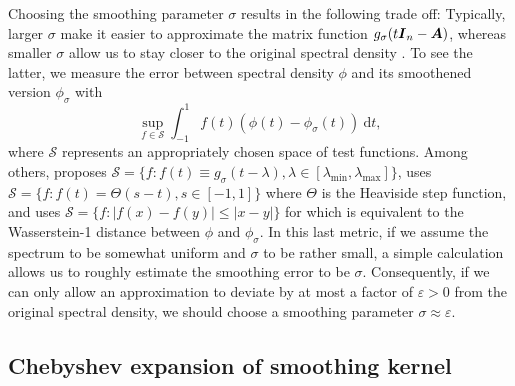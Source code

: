 \documentclass[12pt]{article}
\begin{document}
Choosing the smoothing parameter $\sigma$ results in the following trade off: Typically, larger $\sigma$ make it easier to approximate the matrix function $g_{\sigma}(t\boldsymbol{I}_n - \boldsymbol{A})$, whereas smaller $\sigma$ allow us to stay closer to the original spectral density . To see the latter, we measure the error between spectral density $\phi$ and its smoothened version $\phi_{\sigma}$ with
\begin{equation}
    \sup_{f \in \mathcal{S}} \int_{-1}^{1} f(t) (\phi(t) - \phi_{\sigma}(t))~\mathrm{d}t,
    \label{equ:error-metric}
\end{equation}
where $\mathcal{S}$ represents an appropriately chosen space of test functions. Among others, \cite{lin-2016-approximating-spectral} proposes $\mathcal{S} = \{ f: f(t) \equiv g_{\sigma}(t - \lambda), \lambda \in [\lambda_{\text{min}}, \lambda_{\text{max}}]\}$, \cite{chen-2021-analysis-stochastic} uses $\mathcal{S} = \{f : f(t) = \Theta(s - t), s \in [-1, 1] \}$ where $\Theta$ is the Heaviside step function, and \cite{braverman-2022-sublinear-time} uses $\mathcal{S} = \{f : |f(x) - f(y)| \leq |x - y| \}$ for which  is equivalent to the Wasserstein-1 distance between $\phi$ and $\phi_{\sigma}$. In this last metric, if we assume the spectrum to be somewhat uniform and $\sigma$ to be rather small, a simple calculation allows us to roughly estimate the smoothing error  to be $\sigma$. Consequently, if we can only allow an approximation to deviate by at most a factor of $\varepsilon > 0$ from the original spectral density, we should choose a smoothing parameter $\sigma \approx \varepsilon$.

\subsection{Chebyshev expansion of smoothing kernel}
\label{subsec:chebyshev-expansion}
\end{document}
